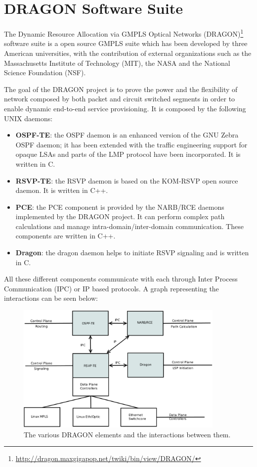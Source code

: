 \documentclass[10pt,a4paper]{report}
\begin{document}
\section{DRAGON Software Suite}

The Dynamic Resource Allocation via GMPLS Optical Networks
(DRAGON)\footnote{\url{http://dragon.maxgigapop.net/twiki/bin/view/DRAGON/}}
software suite is a open source GMPLS suite which has been developed
by three American universities, with the contribution of external
organizations such as the Massachusetts Institute of Technology (MIT),
the NASA and the National Science Foundation (NSF).

The goal of the DRAGON project is to prove the power and the
flexibility of network composed by both packet and circuit switched
segments in order to enable dynamic end-to-end service
provisioning. It is composed by the following UNIX daemons:

\begin{itemize}
\item \textbf{OSPF-TE}: the OSPF daemon is an enhanced version of the
  GNU Zebra OSPF daemon; it has been extended with the traffic
  engineering support for opaque LSAs and parts of the LMP protocol
  have been incorporated. It is written in C.
\item \textbf{RSVP-TE}: the RSVP daemon is based on the KOM-RSVP open
  source daemon. It is written in C++.
\item \textbf{PCE}: the PCE component is provided by the NARB/RCE
  daemons implemented by the DRAGON project. It can perform complex
  path calculations and manage intra-domain/inter-domain
  communication. These components are written in C++.
\item \textbf{Dragon}: the dragon daemon helps to initiate RSVP
  signaling and is written in C.
\end{itemize}

All these different components communicate with each through Inter
Process Communication (IPC) or IP based protocols. A graph
representing the interactions can be seen below:

\begin{figure}[!htbp]
  \begin{center}
    \includegraphics[width=0.9\textwidth]{img/dragon_model}
    \caption[DRAGON model]{The various DRAGON elements and the
      interactions between them.}
    \label{fig:dragon_model}
  \end{center}
\end{figure}
\end{document}
